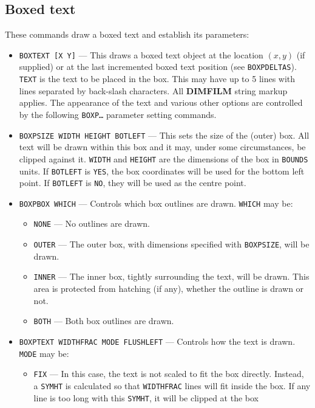 \documentclass[a4paper,twoside,11pt]{article}
\newcommand{\newpara}{\par\vspace{4mm}\noindent}
\newcommand{\textttc}[1]{\texttt{\textcolor{OurRed}{#1}}}
\begin{document}
\subsection{Boxed text}
\newpara
These commands draw a boxed text and establish its parameters:
\begin{itemize}
\item \textttc{BOXTEXT [X Y]} --- This draws a boxed text object at the location $(x,y)$ (if supplied) or
  at the last incremented boxed text position (see \texttt{BOXPDELTAS}). \texttt{TEXT} is the text to be placed in
  the box. This may have up to 5 lines with lines separated by back-slash characters. All \textbf{DIMFILM} string
  markup applies. The appearance of the text and various other options are controlled by the following \texttt{BOXP\ldots}
  parameter setting commands.
\item \textttc{BOXPSIZE WIDTH HEIGHT BOTLEFT} --- This sets the size of the (outer) box. All text will be drawn
  within this box and it may, under some circumstances, be clipped against it. \texttt{WIDTH} and \texttt{HEIGHT} are the dimensions of the
  box in \texttt{BOUNDS} units. If \texttt{BOTLEFT} is \texttt{YES}, the box coordinates will be used for the bottom left point. If \texttt{BOTLEFT}
  is \texttt{NO}, they will be used as the centre point.
\item \textttc{BOXPBOX WHICH} --- Controls which box outlines are drawn. \texttt{WHICH} may be:
  \begin{itemize}
  \item \texttt{NONE} --- No outlines are drawn.
  \item \texttt{OUTER} --- The outer box, with dimensions specified with \texttt{BOXPSIZE}, will be drawn.
  \item \texttt{INNER} --- The inner box, tightly surrounding the text, will be drawn. This area is protected from hatching (if any),
    whether the outline is drawn or not.
  \item \texttt{BOTH} --- Both box outlines are drawn.
  \end{itemize}
\item \textttc{BOXPTEXT WIDTHFRAC MODE FLUSHLEFT} --- Controls how the text is drawn. \texttt{MODE} may be:
  \begin{itemize}
  \item \texttt{FIX} --- In this case, the text is not scaled to fit the box directly. Instead, a \texttt{SYMHT} is calculated so that
    \texttt{WIDTHFRAC} lines will fit inside the box. If any line is too long with this \texttt{SYMHT}, it will be clipped at the box

\end{itemize}
\end{itemize}
\end{document}
